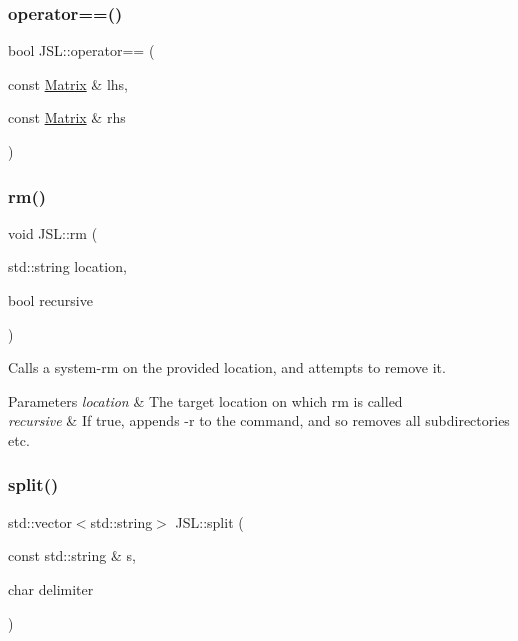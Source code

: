 \mbox{\label{namespaceJSL_a682c8bb3fff54370f38dcb16794fc7c5}} 
\subsubsection{\texorpdfstring{operator==()}{operator==()}\hspace{0.1cm}{\footnotesize\ttfamily [2/2]}}
{\footnotesize\ttfamily bool J\+S\+L\+::operator== (\begin{DoxyParamCaption}\item[{const \hyperlink{classJSL_1_1Matrix}{Matrix} \&}]{lhs,  }\item[{const \hyperlink{classJSL_1_1Matrix}{Matrix} \&}]{rhs }\end{DoxyParamCaption})\hspace{0.3cm}{\ttfamily [inline]}}

\mbox{\label{namespaceJSL_ae48b92e64fb9d321121df976b770efa6}} 
\subsubsection{\texorpdfstring{rm()}{rm()}}
{\footnotesize\ttfamily void J\+S\+L\+::rm (\begin{DoxyParamCaption}\item[{std\+::string}]{location,  }\item[{bool}]{recursive }\end{DoxyParamCaption})\hspace{0.3cm}{\ttfamily [inline]}}

Calls a system-\/rm on the provided location, and attempts to remove it. 
\begin{DoxyParams}{Parameters}
{\em location} & The target location on which rm is called \\
\hline
{\em recursive} & If true, appends -\/r to the command, and so removes all subdirectories etc. \\
\hline
\end{DoxyParams}
\mbox{\label{namespaceJSL_a34a7ba28084b304e97a707c653dce887}} 
\subsubsection{\texorpdfstring{split()}{split()}}
{\footnotesize\ttfamily std\+::vector$<$std\+::string$>$ J\+S\+L\+::split (\begin{DoxyParamCaption}\item[{const std\+::string \&}]{s,  }\item[{char}]{delimiter }\end{DoxyParamCaption})\hspace{0.3cm}{\ttfamily [inline]}}

